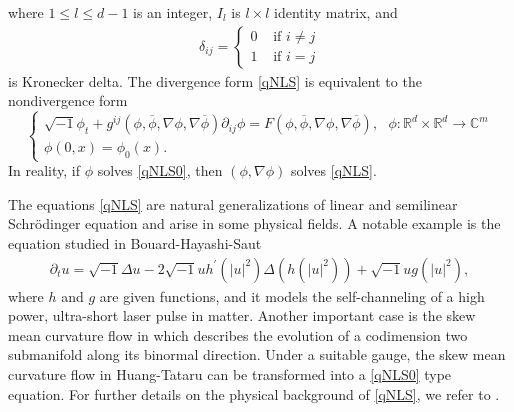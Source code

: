 \documentclass[10pt,twoside,a4paper]{article}
\numberwithin{equation}{section}\allowdisplaybreaks
\def\leq{\leqslant}
\begin{document}
 where $1\leq  l  \leq d-1$ is an integer,   $ I_l $ is $ l\times  l $  identity matrix, and 
\begin{align*}
	\delta_{i j}= \begin{cases}0 & \text { if } i \neq j \\ 1 & \text { if } i=j\end{cases}
\end{align*}
is Kronecker delta.
The  divergence form \eqref{qNLS} is equivalent to the  nondivergence form
	\begin{equation}	 \label{qNLS0}
	\begin{cases}
		\sqrt{-1}\phi_t+g^{ij}\left(\phi,\overline{\phi},\nabla\phi, \nabla \overline{\phi} \right) \partial_{ij} \phi=F\left(\phi,\overline{\phi},\nabla\phi, \nabla \overline{\phi}\right),~~~\phi: \mathbb{R}^d \times \mathbb{R}^d\rightarrow \mathbb{C}^m\\
		\phi(0,x)=\phi_0(x).
	\end{cases}
\end{equation}
In reality,  if $ \phi $ solves \eqref{qNLS0}, then   $ (\phi, \nabla \phi)  $ solves \eqref{qNLS}.


The equations \eqref{qNLS} are   natural generalizations of linear and semilinear Schr\"odinger equation and  arise in some physical fields.   A notable example is the equation studied in Bouard-Hayashi-Saut \cite{de1997global}
\begin{align*}
	\partial_t u=\sqrt{-1} \Delta u-2 \sqrt{-1} u h^{\prime}\left(|u|^2\right) \Delta\left(h\left(|u|^2\right)\right)+\sqrt{-1} u g\left(|u|^2\right),
\end{align*}
where $h$ and $g$ are given functions, and it  models the self-channeling of a high power, ultra-short laser pulse in matter.  Another important case is   the skew mean curvature flow   in \cite{song2021local,huang2022local,li2021global} which  describes the evolution of a codimension two submanifold along its binormal direction. Under a suitable gauge, the skew mean curvature flow in  Huang-Tataru  \cite{huang2022local} can be transformed into a \eqref{qNLS0} type equation.      For further details on the physical background of \eqref{qNLS}, we refer to \cite{kenig2004cauchy, marzuola2012quasilinear, linares2014introduction}.  
\end{document}
